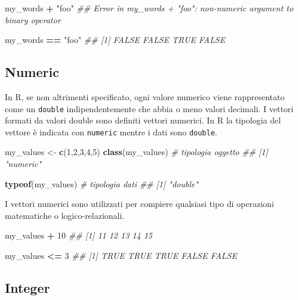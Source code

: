 \documentclass[
]{book}
\newenvironment{Shaded}{\begin{snugshade}}{\end{snugshade}}
\newcommand{\CommentTok}[1]{\textcolor[rgb]{0.56,0.35,0.01}{\textit{#1}}}
\newcommand{\DecValTok}[1]{\textcolor[rgb]{0.00,0.00,0.81}{#1}}
\newcommand{\KeywordTok}[1]{\textcolor[rgb]{0.13,0.29,0.53}{\textbf{#1}}}
\newcommand{\NormalTok}[1]{#1}
\newcommand{\OperatorTok}[1]{\textcolor[rgb]{0.81,0.36,0.00}{\textbf{#1}}}
\newcommand{\StringTok}[1]{\textcolor[rgb]{0.31,0.60,0.02}{#1}}
\begin{document}
\begin{Shaded}
\begin{Highlighting}[]
\NormalTok{my_words }\OperatorTok{+}\StringTok{ "foo"}
\CommentTok{## Error in my_words + "foo": non-numeric argument to binary operator}

\NormalTok{my_words }\OperatorTok{==}\StringTok{ "foo"}
\CommentTok{## [1] FALSE FALSE  TRUE FALSE}
\end{Highlighting}
\end{Shaded}

\hypertarget{numeric}{%
\subsection{Numeric}\label{numeric}}

In R, se non altrimenti specificato, ogni valore numerico viene rappresentato come un \texttt{double} indipendentemente che abbia o meno valori decimali. I vettori formati da valori double sono definiti vettori numerici. In R la tipologia del vettore è indicata con \texttt{numeric} mentre i dati sono \texttt{double}.

\begin{Shaded}
\begin{Highlighting}[]
\NormalTok{my_values <-}\StringTok{ }\KeywordTok{c}\NormalTok{(}\DecValTok{1}\NormalTok{,}\DecValTok{2}\NormalTok{,}\DecValTok{3}\NormalTok{,}\DecValTok{4}\NormalTok{,}\DecValTok{5}\NormalTok{)}
\KeywordTok{class}\NormalTok{(my_values)  }\CommentTok{# tipologia oggetto}
\CommentTok{## [1] "numeric"}

\KeywordTok{typeof}\NormalTok{(my_values) }\CommentTok{# tipologia dati}
\CommentTok{## [1] "double"}
\end{Highlighting}
\end{Shaded}

I vettori numerici sono utilizzati per compiere qualsiasi tipo di operazioni matematiche o logico-relazionali.

\begin{Shaded}
\begin{Highlighting}[]
\NormalTok{my_values }\OperatorTok{+}\StringTok{ }\DecValTok{10}
\CommentTok{## [1] 11 12 13 14 15}

\NormalTok{my_values }\OperatorTok{<=}\StringTok{ }\DecValTok{3}
\CommentTok{## [1]  TRUE  TRUE  TRUE FALSE FALSE}
\end{Highlighting}
\end{Shaded}

\hypertarget{integer}{%
\subsection{Integer}\label{integer}}
\end{document}
